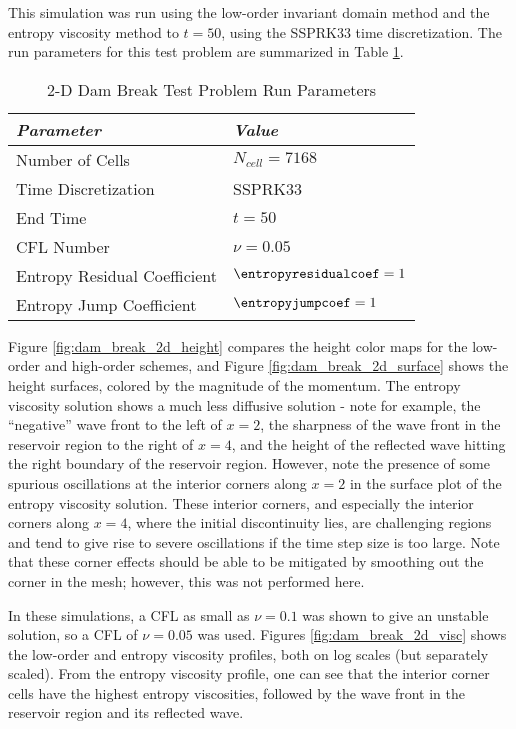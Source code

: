 This simulation was run using the low-order invariant domain method and
the entropy viscosity method to $t=50$, using the SSPRK33 time discretization.
The run parameters for this test problem are summarized in Table
\ref{tab:dam_break_2d_run}.

\begin{table}[htb]\caption{2-D Dam Break Test Problem Run Parameters}
\label{tab:dam_break_2d_run}
\centering
\begin{tabular}{l l}\toprule
\emph{Parameter} & \emph{Value}\\\midrule
Number of Cells & $N_{cell} = 7168$\\
Time Discretization & SSPRK33\\\midrule
End Time        & $t=50$\\
CFL Number      & $\nu=0.05$\\
Entropy Residual Coefficient & $\entropyresidualcoef=1$\\
Entropy Jump Coefficient & $\entropyjumpcoef=1$\\
\bottomrule\end{tabular}
\end{table}

Figure \ref{fig:dam_break_2d_height} compares the height color maps for
the low-order and high-order schemes, and Figure \ref{fig:dam_break_2d_surface} 
shows the height surfaces, colored by the magnitude of the momentum.
The entropy viscosity solution shows a much less diffusive solution - note
for example, the ``negative'' wave front to the left of $x=2$, the sharpness
of the wave front in the reservoir region to the right of $x=4$, and the height
of the reflected wave hitting the right boundary of the reservoir region.
However, note the presence of some spurious oscillations at the interior corners
along $x=2$ in the surface plot of the entropy viscosity solution. These
interior corners, and especially the interior corners along $x=4$, where
the initial discontinuity lies, are challenging regions and tend to give rise to
severe oscillations if the time step size is too large.
Note that these corner effects should be able to be mitigated by smoothing out
the corner in the mesh; however, this was not performed here.

In these simulations,
a CFL as small as $\nu=0.1$ was shown to give an unstable solution, so a
CFL of $\nu=0.05$ was used. Figures \ref{fig:dam_break_2d_visc} shows
the low-order and entropy viscosity profiles, both on log scales (but separately
scaled). From the entropy viscosity profile, one can see that the interior
corner cells have the highest entropy viscosities, followed by the wave
front in the reservoir region and its reflected wave.

